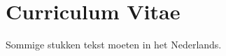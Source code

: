 \documentclass[class=memoir,crop=false]{standalone}
\begin{document}
\ifstandalone\backmatter\fi

\chapter{Curriculum Vitae}
\begin{otherlanguage}{dutch}
Sommige stukken tekst moeten in het Nederlands.
\end{otherlanguage}
\end{document}
